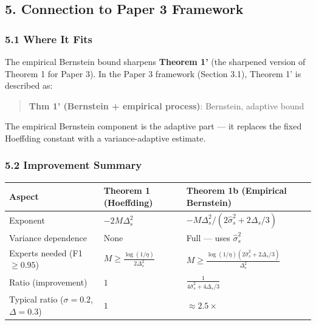 \documentclass[
  12pt,
]{ctexart}
\begin{document}
\subsection{5. Connection to Paper 3
Framework}\label{connection-to-paper-3-framework}

\subsubsection{5.1 Where It Fits}\label{where-it-fits}

The empirical Bernstein bound sharpens \textbf{Theorem 1'} (the
sharpened version of Theorem 1 for Paper 3). In the Paper 3 framework
(Section 3.1), Theorem 1' is described as:

\begin{quote}
\textbf{Thm 1' (Bernstein + empirical process)}: Bernstein, adaptive
bound
\end{quote}

The empirical Bernstein component is the adaptive part --- it replaces
the fixed Hoeffding constant with a variance-adaptive estimate.

\subsubsection{5.2 Improvement Summary}\label{improvement-summary}

\begin{longtable}[]{@{}
  >{\raggedright\arraybackslash}p{}
  >{\raggedright\arraybackslash}p{}
  >{\raggedright\arraybackslash}p{}@{}}
\toprule\noalign{}
\begin{minipage}[b]{\linewidth}\raggedright
Aspect
\end{minipage} & \begin{minipage}[b]{\linewidth}\raggedright
Theorem 1 (Hoeffding)
\end{minipage} & \begin{minipage}[b]{\linewidth}\raggedright
Theorem 1b (Empirical Bernstein)
\end{minipage} \\
\midrule\noalign{}
\endhead
\bottomrule\noalign{}
\endlastfoot
Exponent & \(-2M\Delta_s^2\) &
\(-M\Delta_s^2 / (2\hat{\sigma}_s^2 + 2\Delta_s/3)\) \\
Variance dependence & None & Full --- uses \(\hat{\sigma}_s^2\) \\
Experts needed (F1 \(\geq 0.95\)) &
\(M \geq \frac{\log(1/\eta)}{2\Delta_s^2}\) &
\(M \geq \frac{\log(1/\eta)(2\hat{\sigma}_s^2 + 2\Delta_s/3)}{\Delta_s^2}\) \\
Ratio (improvement) & \(1\) &
\(\frac{1}{4\hat{\sigma}_s^2 + 4\Delta_s/3}\) \\
Typical ratio (\(\sigma=0.2\), \(\Delta=0.3\)) & \(1\) &
\(\approx 2.5\times\) \\
\end{longtable}
\end{document}
